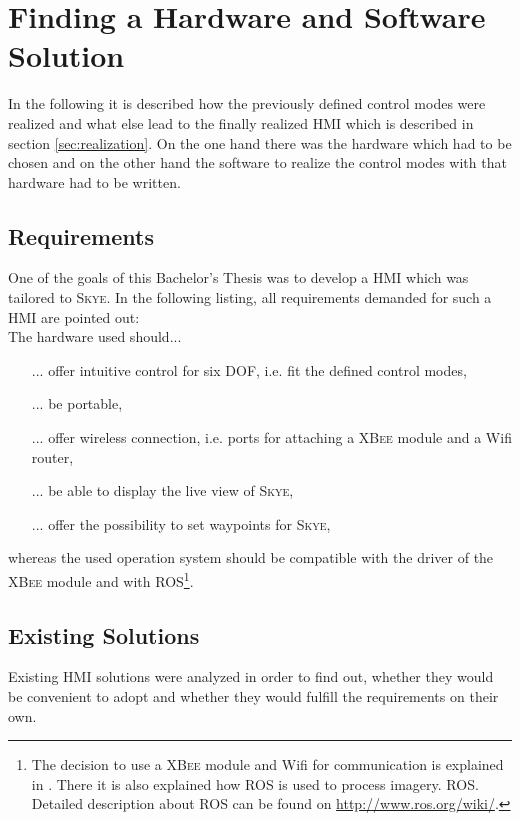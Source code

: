 \graphicspath{{graphics/HMI/}{graphics/control_modes/}}
\chapter{Finding a Hardware and Software Solution}
\label{cha:findHardSoftSolution}
In the following it is described how the previously defined control modes were realized and what else lead to the finally realized HMI which is described in section \ref{sec:realization}. On the one hand there was the hardware which had to be chosen and on the other hand the software to realize the control modes with that hardware had to be written.



\section{Requirements}
\label{sec:requirements}
One of the goals of this Bachelor's Thesis was to develop a HMI which was tailored to \textsc{Skye}. In the following listing, all requirements demanded for such a HMI are pointed out: \\

The hardware used should...
\begin{itemize}
\item[...]{offer intuitive control for six DOF, i.e. fit the defined control modes, }
\item[...]{be portable,}
\item[...]{offer wireless connection, i.e. ports for attaching a \textsc{XBee} module and a Wifi router,}
\item[...]{be able to display the live view of \textsc{Skye},}
\item[...]{offer the possibility to set waypoints for \textsc{Skye},}
\end{itemize}
whereas the used operation system should be compatible with the driver of the \textsc{XBee} module and with \textsc{ROS}\footnote{The decision to use a \textsc{XBee} module and Wifi for communication is explained in \cite{burri}. There it is also explained how \textsc{ROS} is used to process imagery. \textsc{ROS}. Detailed description about \textsc{ROS} can be found on \url{http://www.ros.org/wiki/}.}.


\section{Existing Solutions}
\label{sec:existingSolutions}
Existing HMI solutions were analyzed in order to find out, whether they would be convenient to adopt and whether they would fulfill the requirements on their own. 


